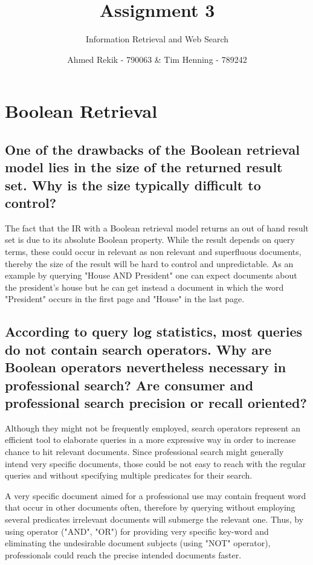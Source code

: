 \documentclass{scrartcl}
\title{Assignment 3}
\subtitle{Information Retrieval and Web Search}
\author{Ahmed Rekik - 790063 \& Tim Henning - 789242}
\begin{document}
\maketitle

\section{Boolean Retrieval}

\subsection{One of the drawbacks of the Boolean retrieval model lies in the size of the returned result
set. Why is the size typically difficult to control? }

The fact that the IR with a Boolean retrieval model returns an out of hand result set is due to its absolute Boolean property. While the result depends on query terms, these could occur in relevant as non relevant and superfluous documents, thereby the size of the result will be hard to control and unpredictable. As an example by querying "House AND President" one can expect documents about the president's house but he can get instead a document in which the word "President" occurs in the first page and "House" in the last page.


\subsection{According to query log statistics, most queries do not contain search operators. Why are
Boolean operators nevertheless necessary in professional search? Are consumer and professional
search precision or recall oriented? }

Although they might not be frequently employed, search operators represent an efficient tool to elaborate queries in a more expressive way in order to increase chance to hit relevant documents. Since professional search might generally intend very specific documents, those could be not easy to reach with the regular queries and without specifying multiple predicates for their search.

A very specific document aimed for a professional use may contain frequent word that occur in other documents often, therefore by querying without employing several predicates irrelevant documents will submerge the relevant one. Thus, by using operator ("AND", "OR") for providing very specific key-word and eliminating the undesirable document subjects (using "NOT" operator), professionals could reach the precise intended documents faster.
\end{document}
